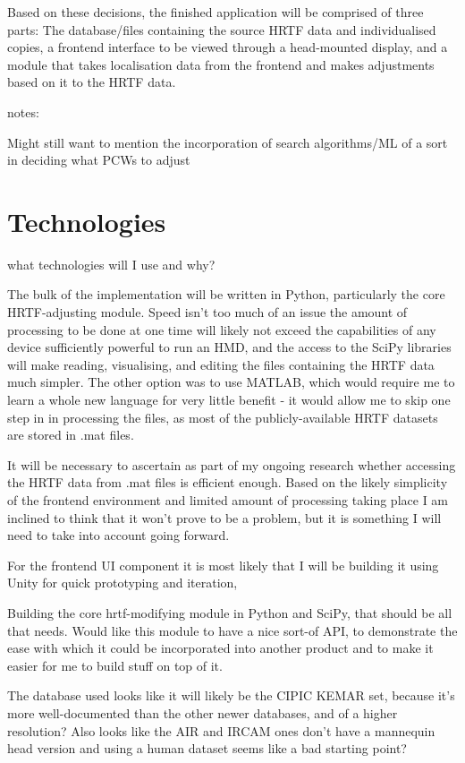 \documentclass[10pt, oneside, a4paper, draft]{scrartcl}
\begin{document}
Based on these decisions, the finished application will be comprised of three parts: The database/files containing the source HRTF data and individualised copies, a frontend interface to be viewed through a head-mounted display, and a module that takes localisation data from the frontend and makes adjustments based on it to the HRTF data. 

notes: 

Might still want to mention the incorporation of search algorithms/ML of a sort in deciding what PCWs to adjust

\section*{Technologies}

what technologies will I use and why?

The bulk of the implementation will be written in Python, particularly the core HRTF-adjusting module. Speed isn't too much of an issue the amount of processing to be done at one time will likely not exceed the capabilities of any device sufficiently powerful to run an HMD, and the access to the SciPy libraries\cite{scipy website???} will make reading, visualising, and editing the files containing the HRTF data much simpler. The other option was to use MATLAB, which would require me to learn a whole new language for very little benefit - it would allow me to skip one step in in processing the files, as most of the publicly-available HRTF datasets are stored in .mat files.

It will be necessary to ascertain as part of my ongoing research whether accessing the HRTF data from .mat files is efficient enough. Based on the likely simplicity of the frontend environment and limited amount of processing taking place I am inclined to think that it won't prove to be a problem, but it is something I will need to take into account going forward. 

For the frontend UI component it is most likely that I will be building it using Unity for quick prototyping and iteration, 


Building the core hrtf-modifying module in Python and SciPy, that should be all that needs. Would like this module to have a nice sort-of API, to demonstrate the ease with which it could be incorporated into another product and to make it easier for me to build stuff on top of it.   

The database used looks like it will likely be the CIPIC KEMAR set, because it's more well-documented than the other newer databases, and of a higher resolution? Also looks like the AIR and IRCAM ones don't have a mannequin head version and using a human dataset seems like a bad starting point?  
\end{document}
